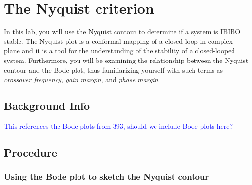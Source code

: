 \chapter{The Nyquist criterion}

In this lab, you will use the Nyquist contour to determine if a system is
IBIBO stable.  The Nyquist plot is a conformal mapping of a closed loop in
complex plane and it is a tool for the understanding of the stability of a
closed-looped system.  Furthermore, you will be examining the relationship
between the Nyquist contour and the Bode plot, thus familiarizing yourself
with such terms as \emph{crossover frequency}\@, \emph{gain margin}\@, and
\emph{phase margin}\@.

\section{Background Info}
\textcolor{blue}{This references the Bode plots from 393, should we include Bode plots here?}

\section{Procedure}

\subsection{Using the Bode plot to sketch the Nyquist
    contour}\label{sec:bodeNyquist}

